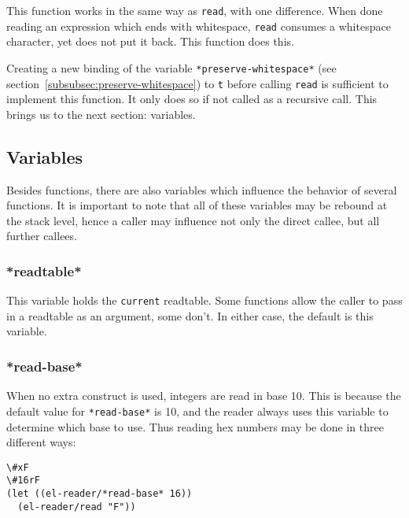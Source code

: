 \documentclass[a4paper,10pt,twoside]{report}
\newcommand{\sym}[1]{\texttt{#1}}
\newcommand{\fun}[1]{\texttt{#1}}
\newcommand{\Read}{\fun{read}}
\newcommand{\tee}{\sym{t}}
\begin{document}
This function works in the same way as \Read{}, with one difference.  When done
reading an expression which ends with whitespace, \Read{} consumes a whitespace
character, yet does not put it back.  This function does this.

Creating a new binding of the variable \sym{*preserve-whitespace*} (see
section~\ref{subsubsec:preserve-whitespace}) to \tee{} before calling \Read{} is
sufficient to implement this function.  It only does so if not called as a
recursive call.  This brings us to the next section: variables.

\subsection{Variables}
\label{subsec:variables}

Besides functions, there are also variables which influence the behavior of
several functions.  It is important to note that all of these variables may be
rebound at the stack level, hence a caller may influence not only the direct
callee, but all further callees.

\subsubsection{*readtable*}
\label{subsubsec:readtable-var}

This variable holds the \texttt{current} readtable.  Some functions allow the
caller to pass in a readtable as an argument, some don’t.  In either case, the
default is this variable.

\subsubsection{*read-base*}
\label{subsubsec:read-base}

When no extra construct is used, integers are read in base 10.  This is because
the default value for \sym{*read-base*} is 10, and the reader always uses this
variable to determine which base to use.  Thus reading hex numbers may be done
in three different ways:

\begin{lstlisting}[style=lispinline]
\#xF
\#16rF
(let ((el-reader/*read-base* 16))
  (el-reader/read "F"))
\end{lstlisting}
\end{document}
